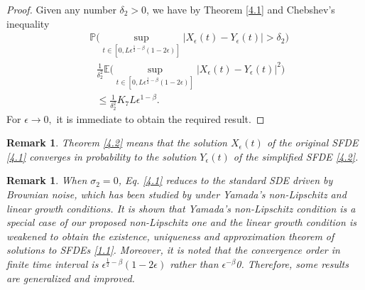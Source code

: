 \documentclass[a4 paper, 12pt]{report}
\theoremstyle{plain}
\newtheorem{remark}[theorem]{\textbf{Remark}}
\begin{document}
\begin{proof}
Given any number $\delta_2>0$, we have by Theorem \ref{4.1} and Chebshev's inequality
\begin{align*}
&\mathbb{P}\bigg(\sup_{t\in[0,L\epsilon^{\frac{1}{2} - \beta}(1-2\epsilon)]}\bigg|X_\epsilon(t) - Y_\epsilon(t)\bigg|>\delta_2\bigg)\\%
&~~~\frac{1}{\delta_2^2}\mathbb{E}\bigg(\sup_{t\in[0,L\epsilon^{\frac{1}{2} - \beta}(1-2\epsilon)]}\bigg|X_\epsilon(t) - Y_\epsilon(t)\bigg|^2\bigg)\\%
&~~~\leq \frac{1}{\delta_2^2}K_7L\epsilon^{1-\beta}.
\end{align*}
For $\epsilon\rightarrow 0,$ it is immediate to obtain the required result.
\end{proof}
\begin{remark}\label{r4.2}
\normalfont
Theorem \ref{4.2} means that the solution $X_\epsilon(t)$ of the original SFDE \eqref{4.1} converges in probability to the solution $Y_\epsilon(t)$ of the simplified SFDE \eqref{4.2}.
\end{remark}
\begin{remark}\label{r4.3}
\normalfont
When $\sigma_2 = 0$, Eq. \eqref{4.1} reduces to the standard SDE driven by
Brownian noise, which has been studied by under Yamada's non-Lipschitz and
linear growth conditions. It is shown that Yamada’s non-Lipschitz condition is a
special case of our proposed non-Lipschitz one and the linear growth condition
is weakened to obtain the existence, uniqueness and approximation theorem of
solutions to SFDEs \eqref{1.1}. Moreover, it is noted that the convergence order in finite
time interval is $\epsilon^{\frac{1}{2} - \beta}(1-2\epsilon)$ rather than $\epsilon^{-\beta}$0. Therefore, some results are generalized and improved.
\end{remark}
\end{document}
